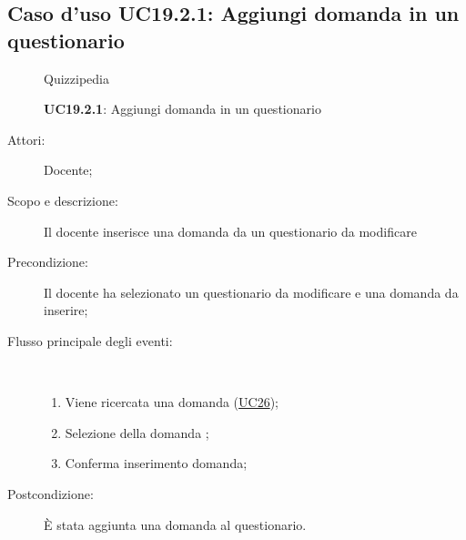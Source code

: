 \subsection{Caso d'uso UC19.2.1: Aggiungi domanda in un questionario}
	\begin{figure}[H]
		\centering
		\begin{resizedtikzpicture}{\textwidth}
		\begin{umlsystem}[x=0, fill=lightgray!20]{Quizzipedia}
		\end{umlsystem}
		\end{resizedtikzpicture}
		\caption{\textbf{UC19.2.1}: Aggiungi domanda in un questionario}
		\label{UC19.2.1}
	\end{figure}
\begin{description}
\item[Attori:] Docente;
\item[Scopo e descrizione:] Il docente inserisce una domanda da un questionario da modificare
      \item[Precondizione:] Il docente ha selezionato un questionario da modificare e una domanda da inserire;

        \item[Flusso principale degli eventi:] \ 
 \begin{enumerate}
          \item Viene ricercata una domanda (\hyperlink{UC26}{UC26});
          \item Selezione della domanda	;
          \item Conferma inserimento domanda;

      \end{enumerate}
    \item[Postcondizione:] È stata aggiunta una domanda al questionario.
  \end{description}
\hypertarget{UC19.2.2}{}
